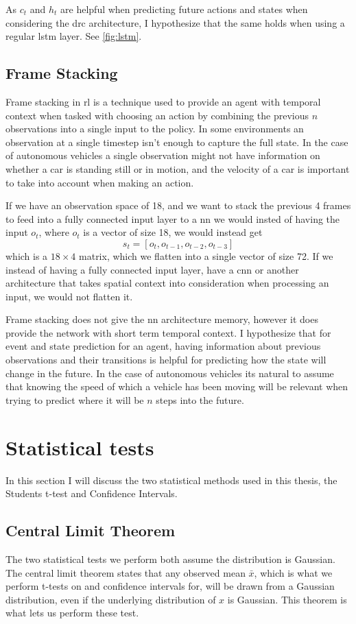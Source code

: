 \documentclass[UKenglish]{uiomasterthesis}
\begin{document}
As $c_t$ and $h_t$ are helpful when predicting future actions and states \cite{chung2024predictingfutureactionsreinforcement} when considering the \ac{drc} architecture, I hypothesize that the same holds when using a regular \ac{lstm} layer. See \cref{fig:lstm}.

\subsection{Frame Stacking}
Frame stacking in \ac{rl} is a technique used to provide an agent with temporal context when tasked with choosing an action by combining the previous $n$ observations into a single input to the policy. In some environments an observation at a single timestep isn't enough to capture the full state. In the case of autonomous vehicles a single observation might not have information on whether a car is standing still or in motion, and the velocity of a car is important to take into account when making an action.

If we have an observation space of 18, and we want to stack the previous 4 frames to feed into a fully connected input layer to a \ac{nn} we would insted of having the input $o_t$, where $o_t$ is a vector of size 18, we would instead get $$s_t = [o_t, o_{t-1}, o_{t-2}, o_{t-3}]$$ which is a $18\times4$ matrix, which we flatten into a single vector of size 72. If we instead of having a fully connected input layer, have a \ac{cnn} or another architecture that takes spatial context into consideration when processing an input, we would not flatten it.

Frame stacking does not give the \ac{nn} architecture memory, however it does provide the network with short term temporal context. I hypothesize that for event and state prediction for an agent, having information about previous observations and their transitions is helpful for predicting how the state will change in the future. In the case of autonomous vehicles its natural to assume that knowing the speed of which a vehicle has been moving will be relevant when trying to predict where it will be $n$ steps into the future.

\section{Statistical tests}
\label{sec:stat_meth}
In this section I will discuss the two statistical methods used in this thesis, the Students t-test and Confidence Intervals.

\subsection{Central Limit Theorem}
The two statistical tests we perform both assume the distribution is Gaussian. The central limit theorem states that any observed mean $\bar{x}$, which is what we perform t-tests on and confidence intervals for, will be drawn from a Gaussian distribution, even if the underlying distribution of $x$ is Gaussian\cite{clt}. This theorem is what lets us perform these test.
\end{document}
